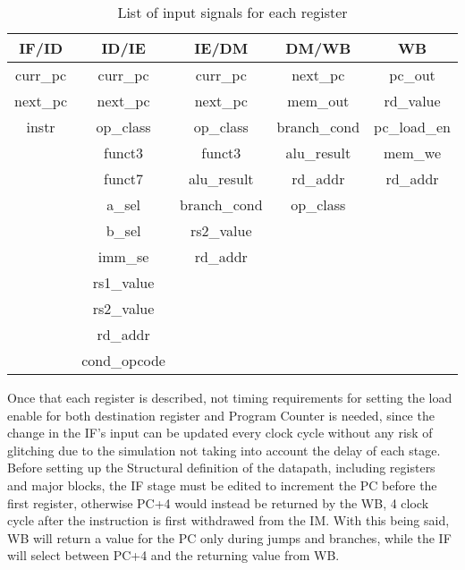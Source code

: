 \begin{table}[ht]
\begin{center}
\begin{tabular}{|c|c|c|c|c|}
    \hline
    IF/ID & ID/IE & IE/DM & DM/WB & WB \\
    \hline
    curr{\_}pc  & curr{\_}pc        & curr{\_}pc        & next{\_}pc        & pc{\_}out \\
    next{\_}pc  & next{\_}pc        & next{\_}pc        & mem{\_}out        & rd{\_}value \\
    instr       & op{\_}class       & op{\_}class       & branch{\_}cond    & pc{\_}load{\_}en\\
                & funct3            & funct3            & alu{\_}result     & mem{\_}we\\
                & funct7            & alu{\_}result     & rd{\_}addr        & rd{\_}addr\\
                & a{\_}sel          & branch{\_}cond    & op{\_}class       & \\
                & b{\_}sel          & rs2{\_}value      &                   & \\
                & imm{\_}se         & rd{\_}addr        &                   & \\
                & rs1{\_}value      &                   &                   & \\
                & rs2{\_}value      &                   &                   & \\
                & rd{\_}addr        &                   &                   & \\
                & cond{\_}opcode    &                   &                   & \\
    \hline
\end{tabular}
\caption{List of input signals for each register}
\label{table:signals_pipeline}
\end{center}
\end{table}

Once that each register is described, not timing requirements for setting the load enable for both destination register and Program Counter is needed, since the change in the IF's input can be updated every clock cycle without any risk of glitching due to the simulation not taking into account the delay of each stage. 
Before setting up the Structural definition of the datapath, including registers and major blocks, the IF stage must be edited to increment the PC before the first register, otherwise PC+4 would instead be returned by the WB, 4 clock cycle after the instruction is first withdrawed from the IM. With this being said, WB will return a value for the PC only during jumps and branches, while the IF will select between PC+4 and the returning value from WB.

